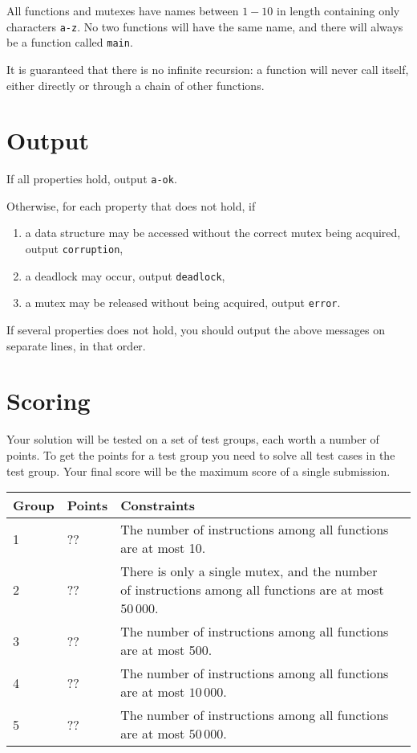 All functions and mutexes have names between $1-10$ in length containing only characters \texttt{a-z}.
No two functions will have the same name, and there will always be a function called \texttt{main}.

It is guaranteed that there is no infinite recursion: a function will never call itself, either directly or through a chain of other functions.

\section*{Output}
If all properties hold, output \texttt{a-ok}.

Otherwise, for each property that does not hold, if
\begin{enumerate}
  \item a data structure may be accessed without the correct mutex being acquired, output \texttt{corruption},
  \item a deadlock may occur, output \texttt{deadlock},
  \item a mutex may be released without being acquired, output \texttt{error}.
\end{enumerate}

If several properties does not hold, you should output the above messages on separate lines, in that order.

\section*{Scoring}
Your solution will be tested on a set of test groups, each worth a number of points.
To get the points for a test group you need to solve all test cases in the test group.
Your final score will be the maximum score of a single submission.

\noindent
\begin{tabular}{| l | l | l | l |}
\hline
Group & Points & Constraints \\ \hline
1     & ??     & The number of instructions among all functions are at most 10. \\ \hline
2     & ??     & There is only a single mutex, and the number of instructions among all functions are at most $50\,000$. \\ \hline
3     & ??     & The number of instructions among all functions are at most 500. \\ \hline
4     & ??     & The number of instructions among all functions are at most $10\,000$. \\ \hline
5     & ??     & The number of instructions among all functions are at most $50\,000$. \\ \hline
\end{tabular}
